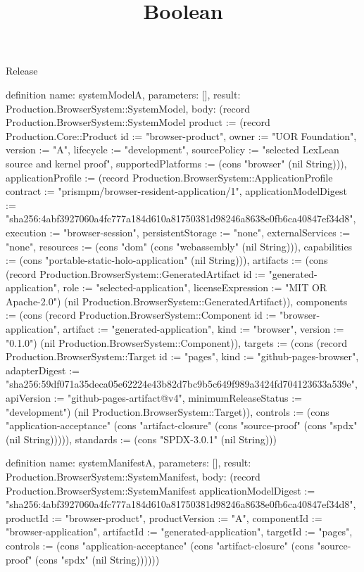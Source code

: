 \begin{lexlean}{Release}
\title{Boolean}
\begin{semanticmodule}
definition{
  name: systemModelA,
  parameters: [],
  result: Production.BrowserSystem::SystemModel,
  body: (record Production.BrowserSystem::SystemModel {product := (record Production.Core::Product {id := "browser-product", owner := "UOR Foundation", version := "A", lifecycle := "development", sourcePolicy := "selected LexLean source and kernel proof", supportedPlatforms := (cons "browser" (nil String))}), applicationProfile := (record Production.BrowserSystem::ApplicationProfile {contract := "prismpm/browser-resident-application/1", applicationModelDigest := "sha256:4abf3927060a4fc777a184d610a81750381d98246a8638e0fb6ca40847ef34d8", execution := "browser-session", persistentStorage := "none", externalServices := "none", resources := (cons "dom" (cons "webassembly" (nil String))), capabilities := (cons "portable-static-holo-application" (nil String))}), artifacts := (cons (record Production.BrowserSystem::GeneratedArtifact {id := "generated-application", role := "selected-application", licenseExpression := "MIT OR Apache-2.0"}) (nil Production.BrowserSystem::GeneratedArtifact)), components := (cons (record Production.BrowserSystem::Component {id := "browser-application", artifact := "generated-application", kind := "browser", version := "0.1.0"}) (nil Production.BrowserSystem::Component)), targets := (cons (record Production.BrowserSystem::Target {id := "pages", kind := "github-pages-browser", adapterDigest := "sha256:59df071a35deca05e62224e43b82d7bc9b5c649f989a3424fd704123633a539e", apiVersion := "github-pages-artifact@v4", minimumReleaseStatus := "development"}) (nil Production.BrowserSystem::Target)), controls := (cons "application-acceptance" (cons "artifact-closure" (cons "source-proof" (cons "spdx" (nil String))))), standards := (cons "SPDX-3.0.1" (nil String))})
}

definition{
  name: systemManifestA,
  parameters: [],
  result: Production.BrowserSystem::SystemManifest,
  body: (record Production.BrowserSystem::SystemManifest {applicationModelDigest := "sha256:4abf3927060a4fc777a184d610a81750381d98246a8638e0fb6ca40847ef34d8", productId := "browser-product", productVersion := "A", componentId := "browser-application", artifactId := "generated-application", targetId := "pages", controls := (cons "application-acceptance" (cons "artifact-closure" (cons "source-proof" (cons "spdx" (nil String)))))})
}


\end{semanticmodule}
\end{lexlean}
